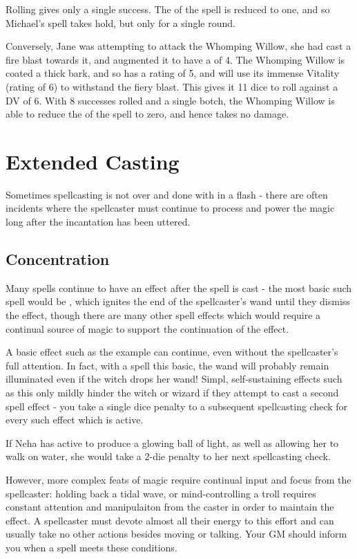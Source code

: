 Rolling  gives only a single success. The  of the spell is reduced to one, and so Michael's spell takes hold, but only for a single round. 

Conversely, Jane was attempting to attack the Whomping Willow, she had cast a \levelThree{} fire blast towards it, and augmented it to have a  of 4. The Whomping Willow is coated a thick bark, and so has a  rating of 5, and will use its immense Vitality (rating of 6) to withstand the fiery blast. This gives it 11 dice to roll against a DV of 6. With 8 successes rolled and a single botch, the Whomping Willow is able to reduce the  of the spell to zero, and hence takes no damage. 


\section{Extended Casting}

Sometimes spellcasting is not over and done with in a flash - there are often incidents where the spellcaster must continue to process and power the magic long after the incantation has been uttered.

\subsection{Concentration}

Many spells continue to have an effect after the spell is cast - the most basic such spell would be , which ignites the end of the spellcaster's wand until they dismiss the effect, though there are many other spell effects which would require a continual source of magic to support the continuation of the effect.

A basic effect such as the  example can continue, even without the spellcaster's full attention. In fact, with a spell this basic, the wand will probably remain illuminated even if the witch drops her wand! Simpl, self-sustaining effects such as this only mildly hinder the witch or wizard if they attempt to cast a second spell effect - you take a single dice penalty to a subsequent spellcasting check for every such effect which is active. 

If Neha has  active to produce a glowing ball of light, as well as  allowing her to walk on water, she would take a 2-die penalty to her next spellcasting check. 

However, more complex feats of magic require continual input and focus from the spellcaster: holding back a tidal wave, or mind-controlling a troll requires constant attention and manipulaiton from the caster in order to maintain the effect. A spellcaster must devote almost all their energy to this effort and can usually take no other actions besides moving or talking. Your GM should inform you when a spell meets these conditions. 


